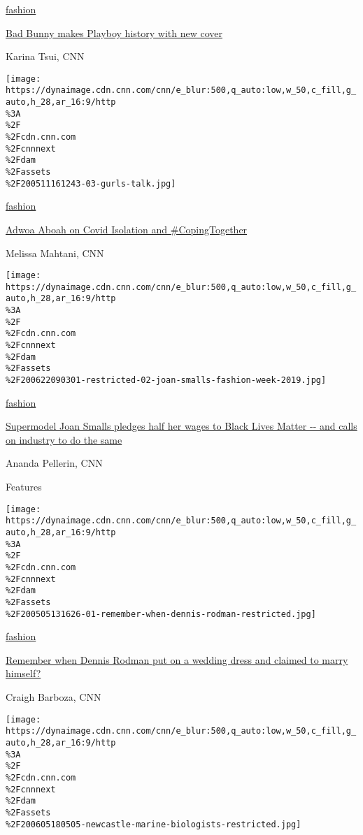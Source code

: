 \href{/style/fashion}{fashion}

\href{/style/article/bad-bunny-playboy-magazine/index.html}{Bad Bunny
makes Playboy history with new cover}

Karina Tsui, CNN

\href{/style/article/adwoa-aboah-coronavirus-mental-health/index.html}{}

\texttt{[image: https://dynaimage.cdn.cnn.com/cnn/e\_blur:500,q\_auto:low,w\_50,c\_fill,g\_auto,h\_28,ar\_16:9/http\\\%3A\\\%2F\\\%2Fcdn.cnn.com\\\%2Fcnnnext\\\%2Fdam\\\%2Fassets\\\%2F200511161243-03-gurls-talk.jpg]}

\href{/style/fashion}{fashion}

\href{/style/article/adwoa-aboah-coronavirus-mental-health/index.html}{Adwoa
Aboah on Covid Isolation and \#CopingTogether}

Melissa Mahtani, CNN

\href{/style/article/joan-smalls-donatemywage/index.html}{}

\texttt{[image: https://dynaimage.cdn.cnn.com/cnn/e\_blur:500,q\_auto:low,w\_50,c\_fill,g\_auto,h\_28,ar\_16:9/http\\\%3A\\\%2F\\\%2Fcdn.cnn.com\\\%2Fcnnnext\\\%2Fdam\\\%2Fassets\\\%2F200622090301-restricted-02-joan-smalls-fashion-week-2019.jpg]}

\href{/style/fashion}{fashion}

\href{/style/article/joan-smalls-donatemywage/index.html}{Supermodel
Joan Smalls pledges half her wages to Black Lives Matter -\/- and calls
on industry to do the same}

Ananda Pellerin, CNN

Features

\href{/style/article/remember-when-dennis-rodman/index.html}{}

\texttt{[image: https://dynaimage.cdn.cnn.com/cnn/e\_blur:500,q\_auto:low,w\_50,c\_fill,g\_auto,h\_28,ar\_16:9/http\\\%3A\\\%2F\\\%2Fcdn.cnn.com\\\%2Fcnnnext\\\%2Fdam\\\%2Fassets\\\%2F200505131626-01-remember-when-dennis-rodman-restricted.jpg]}

\href{/style/fashion}{fashion}

\href{/style/article/remember-when-dennis-rodman/index.html}{Remember
when Dennis Rodman put on a wedding dress and claimed to marry himself?}

Craigh Barboza, CNN

\href{/style/article/laundry-plastics-microfibers-world-oceans-day/index.html}{}

\texttt{[image: https://dynaimage.cdn.cnn.com/cnn/e\_blur:500,q\_auto:low,w\_50,c\_fill,g\_auto,h\_28,ar\_16:9/http\\\%3A\\\%2F\\\%2Fcdn.cnn.com\\\%2Fcnnnext\\\%2Fdam\\\%2Fassets\\\%2F200605180505-newcastle-marine-biologists-restricted.jpg]}

